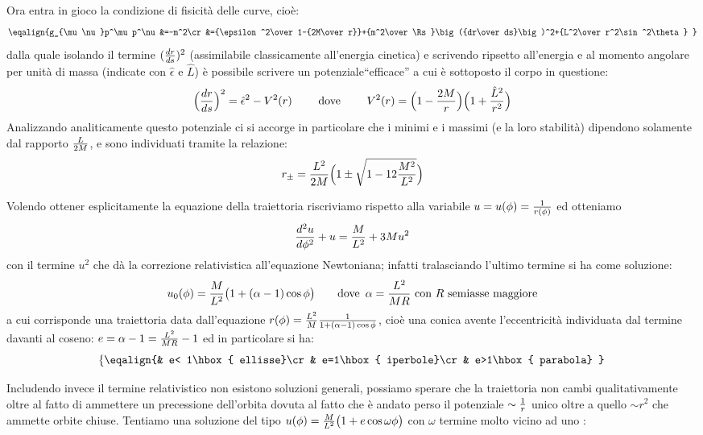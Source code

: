 Ora entra in gioco la condizione di fisicit\`a delle curve, cio\`e:
$$
\eqalign{%
g_{\mu\nu}p^\mu p^\nu&=-m^2\cr
&={\epsilon^2\over 1-{2M\over r}}+{m^2\over\Rs}\big({dr\over ds}\big)^2+{L^2\over r^2\sin^2\theta}
}
$$
dalla quale isolando il termine $({dr\over ds})^2$ (assimilabile classicamente all'energia cinetica) e scrivendo ripsetto all'energia e al momento angolare per unit\`a di massa (indicate con $\hat{\epsilon}$ e $\hat{L}$) \`e possibile scrivere un potenziale``efficace'' a cui \`e sottoposto il corpo in questione:
$$
\Big({dr\over ds}\Big)^2=\hat{\epsilon}^2-V^2(r)\qquad \hbox{ dove }\qquad V^2(r)=\Big(1-{2M\over r}\Big)\Big(1+{\hat{L}^2\over r^2}\Big)
$$
Analizzando analiticamente questo potenziale ci si accorge in particolare che i minimi e i massimi (e la loro stabilit\`a) dipendono solamente dal rapporto ${L\over 2M}$, e sono individuati tramite la relazione:
$$
r_{\pm}={L^2\over 2M}\Big(1\pm\sqrt{1-12{M^2\over L^2}}\Big)
$$
\par Volendo ottener esplicitamente la equazione della traiettoria riscriviamo rispetto alla variabile $u=u(\phi)={1\over r(\phi)}$ ed otteniamo
$$
{d^2u\over d\phi^2}+u={M\over L^2}+3Mu^2
$$
con il termine $u^2$ che d\`a la correzione relativistica all'equazione Newtoniana; infatti tralasciando l'ultimo termine si ha come soluzione:
$$
u_0(\phi)={M\over L^2}\big(1+(\alpha-1)\cos\phi\big)\qquad \hbox{dove }\,\alpha={L^2\over MR}\hbox{ con $R$ semiasse maggiore}
$$
a cui corrisponde una traiettoria data dall'equazione $r(\phi)={L^2\over M}{1\over 1+(\alpha -1)\cos\phi}$, cio\`e una conica avente l'eccentricit\`a individuata dal termine davanti al coseno: $e=\alpha -1={L^2\over MR}-1$ ed in particolare si ha:
$$
\left\{\eqalign{%
& e< 1\hbox{ ellisse}\cr
& e=1\hbox{ iperbole}\cr
& e>1\hbox{ parabola}
}\right.
$$
\par Includendo invece il termine relativistico non esistono soluzioni generali, possiamo sperare che la traiettoria non cambi qualitativamente oltre al fatto di ammettere un precessione dell'orbita dovuta al fatto che \`e andato perso il potenziale $\sim {1\over r}$ unico oltre a quello $\sim r^2$ che ammette orbite chiuse. Tentiamo una soluzione del tipo $u(\phi)={M\over L^2}\big(1+e\cos\omega\phi\big)$ con $\omega$ termine molto vicino ad uno :
